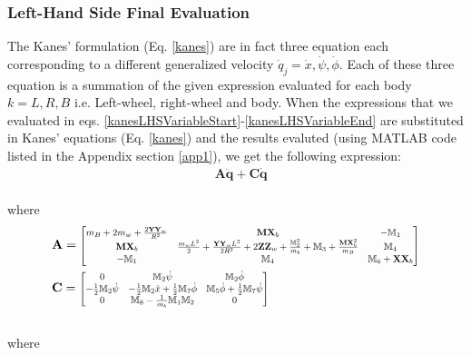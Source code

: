\documentclass[a4paper,10pt]{article}
\newcommand\scalemath[2]{\scalebox{#1}{\mbox{\ensuremath{\displaystyle #2}}}}
\begin{document}
\subsubsection{Left-Hand Side Final Evaluation}
The Kanes' formulation (Eq. \ref{kanes}) are in fact three equation each corresponding to a different generalized velocity
${\dot{q}_j} = {\dot{x},\dot\psi,\dot\phi}$. Each of these three equation is a summation of the given expression evaluated
for each body ${k}={L,R,B}$ i.e. Left-wheel, right-wheel and body. When the expressions that we evaluated in eqs. 
\ref{kanesLHSVariableStart}-\ref{kanesLHSVariableEnd} are substituted in Kanes' equations (Eq. \ref{kanes}) and the results 
evaluted (using MATLAB code listed in the Appendix section \ref{app1}), we get the following expression:
\begin{align}
 &\mathbf{A\ddot{q}+C\dot{q}} \nonumber
\end{align}\\
where
\begin{align} \begin{split}
 &\mathbf{A}=\scalemath{0.75}{\left[\begin{matrix}
  m_B+2m_w+\frac{2\mathbf{YY}_w}{R^2} &
  \mathbf{MX}_b &
  -\mathbb{M}_1 \\
  \mathbf{MX}_b &
  \frac{m_wL^2}{2}+\frac{\mathbf{YY}_wL^2}{2R^2}+2\mathbf{ZZ}_w+\frac{\mathbb{M}_2^2}{m_b}+\mathbb{M}_3 + \frac{\mathbf{MX}_b^2}{m_B} &
  \mathbb{M}_4 \\
  -\mathbb{M}_1 &
  \mathbb{M}_4 &
  \mathbb{M}_6+\mathbf{XX}_b
  \end{matrix}\right]}  \\
 &\mathbf{C}=\scalemath{0.75}{\left[\begin{matrix}
  0 &
  \mathbb{M}_2\dot\psi &
  \mathbb{M}_2\dot\phi \\
  -\frac{1}{2}\mathbb{M}_2\dot\psi &  
  -\frac{1}{2}\mathbb{M}_2\dot{x}+\frac{1}{2}\mathbb{M}_7\dot\phi &
  \mathbb{M}_5\dot\phi+\frac{1}{2}\mathbb{M}_7\dot\psi \\
  0 &
  \mathbb{M}_8-\frac{1}{m_b}\mathbb{M}_1\mathbb{M}_2 &
  0
 \end{matrix}\right]} \label{kanesAC}
\end{split}\end{align}\\
where
\end{document}
